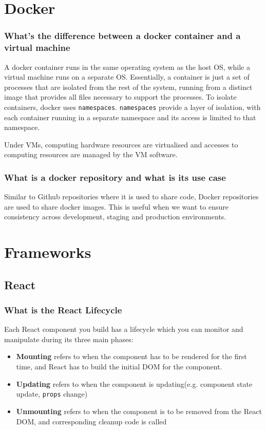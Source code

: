 \documentclass[12pt, a4paper]{article}
\newcommand{\code}[1]{\texttt{#1}}
\begin{document}
\pagebreak


\pagebreak

\section*{Docker}
\subsubsection*{What's the difference between a docker container and a virtual machine}
A docker container runs in the same operating system as the host OS, while a virtual machine runs on a separate OS.
Essentially, a container is just a set of processes that are isolated from the rest of the system, running from a distinct image that provides all files necessary to support the processes.
To isolate containers, docker uses \code{namespaces}. 
\code{namespaces} provide a layer of isolation, with each container running in a separate namespace and its access is limited to that namespace.

Under VMs, computing hardware resources are virtualised and accesses to computing resources are managed by the VM software.

\subsubsection*{What is a docker repository and what is its use case}
Similar to Github repositories where it is used to share code, Docker repositories are used to share docker images.
This is useful when we want to ensure consistency across development, staging and production environments.

\pagebreak

\section*{Frameworks}
\subsection*{React}
\subsubsection*{What is the React Lifecycle}
Each React component you build has a lifecycle which you can monitor and manipulate during its three main phases:
\begin{itemize}
  \item \textbf{Mounting} refers to when the component has to be rendered for the first time, and React has to build the initial DOM for the component.
  \item \textbf{Updating} refers to when the component is updating(e.g. component state update, \code{props} change)
  \item \textbf{Unmounting} refers to when the component is to be removed from the React DOM, and corresponding cleanup code is called
\end{itemize}
\end{document}
